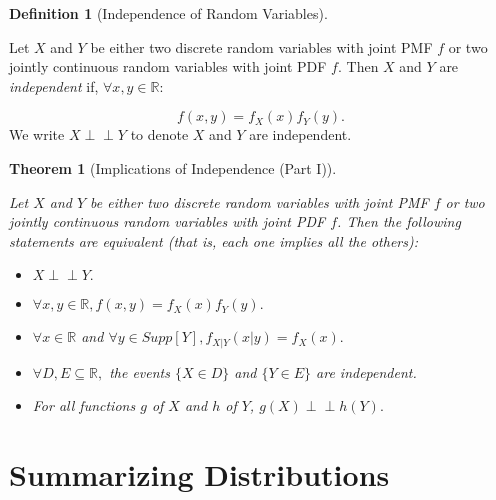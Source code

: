 \documentclass[
]{article}
\providecommand{\tightlist}{%
  \setlength{\itemsep}{0pt}\setlength{\parskip}{0pt}}
\newtheorem{theorem}{Theorem}[section]
\theoremstyle{definition}
\newtheorem{definition}{Definition}[section]
\theoremstyle{definition}
\theoremstyle{definition}
\theoremstyle{remark}
\begin{document}
\begin{definition}[Independence of Random Variables]
\protect\hypertarget{def:unlabeled-div-52}{}\label{def:unlabeled-div-52}

Let \(X\) and \(Y\) be either two discrete random variables with joint PMF \(f\) or two jointly continuous random variables with joint PDF \(f\). Then \(X\) and \(Y\) are \emph{independent} if, \(\forall x,y \in \mathbb{R}\):

\[f(x,y) = f_X(x)f_Y(y).\]
We write \(X \perp \!\!\! \perp Y\) to denote \(X\) and \(Y\) are independent.

\end{definition}

\begin{theorem}[Implications of Independence (Part I)]
\protect\hypertarget{thm:unlabeled-div-53}{}\label{thm:unlabeled-div-53}

Let \(X\) and \(Y\) be either two discrete random variables with joint PMF \(f\) or two jointly continuous random variables with joint PDF \(f\). Then the following statements are equivalent (that is, each one implies all the others):

\begin{itemize}
\tightlist
\item
  \(X \perp \!\!\! \perp Y.\)
\item
  \(\forall x,y \in \mathbb{R}, f(x,y) = f_X(x)f_Y(y).\)
\item
  \(\forall x \in \mathbb{R}\) and \(\forall y \in Supp[Y], f_{X|Y}(x|y) = f_X(x).\)
\item
  \(\forall D,E \subseteq \mathbb{R},\) the events \(\{X \in D\}\) and \(\{Y \in E\}\) are independent.
\item
  For all functions \(g\) of \(X\) and \(h\) of \(Y\), \(g(X) \perp \!\!\! \perp h(Y).\)
\end{itemize}

\end{theorem}

\hypertarget{summarizing-distributions}{%
\section{Summarizing Distributions}\label{summarizing-distributions}}
\end{document}
